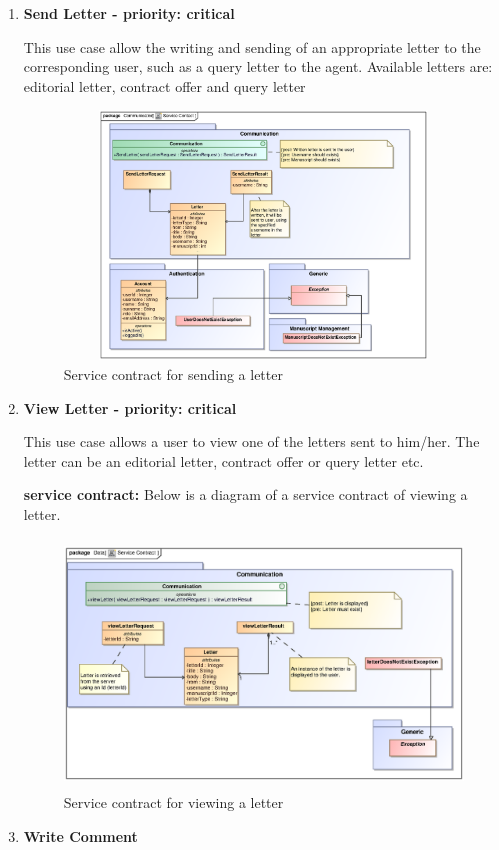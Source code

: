 \begin{enumerate}
\item \textbf{Send Letter - priority: critical}
\par{This use case allow the writing and sending of an appropriate letter to the corresponding user, such as a query letter to the agent. Available letters are: editorial letter, contract offer and query letter}

\begin{figure}[h]
\includegraphics[height=250px, width=500px]{epsImages/Communication/sendLetterServiceContract.eps}
\caption{Service contract for sending a letter}
\end{figure}

\item \textbf{View Letter - priority: critical}\\
\par{This use case allows a user to view one of the letters sent to him/her. The letter can be an editorial letter, contract offer or query letter etc.}

\textbf{service contract:} Below is a diagram of a service contract of viewing a letter.

\begin{figure}[h]
\includegraphics[height=250px, width=500px]{epsImages/Communication/viewLetterServiceContract.eps}
\caption{Service contract for viewing a letter}
\end{figure}
\newpage

\item \textbf{Write Comment}

\end{enumerate}
